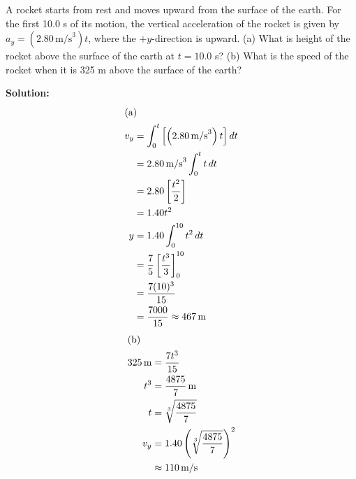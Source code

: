 \documentclass[12pt]{article}
\newenvironment{problem}[2][]{
    \begin{trivlist}
        \item[
            {\bfseries #1}
            {\bfseries #2}
        ]
}{\end{trivlist}}
\newcommand{\solution}{\medskip\noindent\textbf{Solution:}}
\newcommand{\Part}[1]{\shortintertext{(#1)}}
\newcommand{\unit}[1]{\, \text{#1}}
\newcommand{\m}{\unit{m}}
\newcommand{\mps}{\unit{m/s}}
\begin{document}
\begin{problem}{2.51}
    A rocket starts from rest and moves upward from the surface of the earth.
    For the first 10.0 s of its motion, the vertical acceleration of the rocket is given by $a_y = \left(2.80 \mps^3\right) t$, where the $+y$-direction is upward.
    (a) What is height of the rocket above the surface of the earth at $t= 10.0$ s?
    (b) What is the speed of the rocket when it is 325 m above the surface of the earth?

    \solution
    \begin{align}
        \Part{a}
        v_y &= \int_0^t \left[\left(2.80 \mps^3\right) t\right] dt \\
        &= 2.80 \mps^3 \int_0^t t \, dt \\
        &= 2.80 \left[\frac{t^2}{2}\right] \\
        &= 1.40 t^2 \\
        y &= 1.40 \int_0^{10} t^2 \, dt \\
        &= \frac{7}{5} \left[\frac{t^3}{3}\right]_0^{10} \\
        &= \frac{7(10)^3}{15} \\
        &= \frac{7000}{15} \approx 467 \m
    \end{align}
    \begin{align}
        \Part{b}
        325 \m &= \frac{7t^3}{15} \\
        t^3 &= \frac{4875}{7} \m \\
        t &= \sqrt[3]{\frac{4875}{7}} \\
        v_y &= 1.40 \left(\sqrt[3]{\frac{4875}{7}}\right)^2 \\
        &\approx 110 \mps
    \end{align}
\end{problem}

\clearpage
\end{document}
